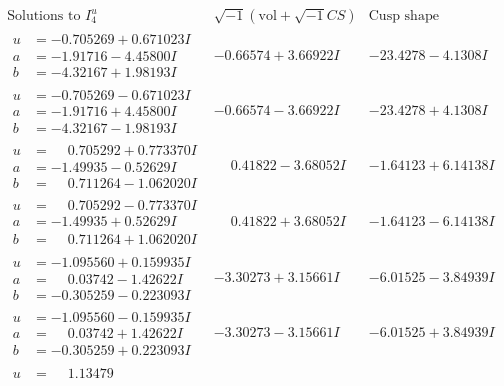 \documentclass[1p]{elsarticle_modified}
\theoremstyle{definition}
\newcommand{\I}{\sqrt{-1}}
\begin{document}
$$\begin{array}{c|c|c}  
\text{Solutions to }I^u_{4}& \I (\text{vol} + \sqrt{-1}CS) & \text{Cusp shape}\\
 \hline 
\begin{aligned}
u &= -0.705269 + 0.671023 I \\
a &= -1.91716 - 4.45800 I \\
b &= -4.32167 + 1.98193 I\end{aligned}
 & -0.66574 + 3.66922 I & -23.4278 - 4.1308 I \\ \hline\begin{aligned}
u &= -0.705269 - 0.671023 I \\
a &= -1.91716 + 4.45800 I \\
b &= -4.32167 - 1.98193 I\end{aligned}
 & -0.66574 - 3.66922 I & -23.4278 + 4.1308 I \\ \hline\begin{aligned}
u &= \phantom{-}0.705292 + 0.773370 I \\
a &= -1.49935 - 0.52629 I \\
b &= \phantom{-}0.711264 - 1.062020 I\end{aligned}
 & \phantom{-}0.41822 - 3.68052 I & -1.64123 + 6.14138 I \\ \hline\begin{aligned}
u &= \phantom{-}0.705292 - 0.773370 I \\
a &= -1.49935 + 0.52629 I \\
b &= \phantom{-}0.711264 + 1.062020 I\end{aligned}
 & \phantom{-}0.41822 + 3.68052 I & -1.64123 - 6.14138 I \\ \hline\begin{aligned}
u &= -1.095560 + 0.159935 I \\
a &= \phantom{-}0.03742 - 1.42622 I \\
b &= -0.305259 - 0.223093 I\end{aligned}
 & -3.30273 + 3.15661 I & -6.01525 - 3.84939 I \\ \hline\begin{aligned}
u &= -1.095560 - 0.159935 I \\
a &= \phantom{-}0.03742 + 1.42622 I \\
b &= -0.305259 + 0.223093 I\end{aligned}
 & -3.30273 - 3.15661 I & -6.01525 + 3.84939 I \\ \hline\begin{aligned}
u &= \phantom{-}1.13479\phantom{ +0.000000I} \\

\end{aligned}
\end{array}$$
\end{document}
